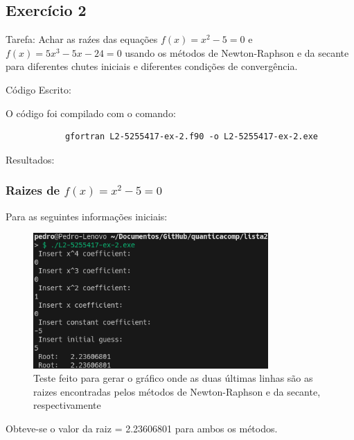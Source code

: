 \documentclass[12pt, a4paper]{article} %
\begin{document}
    \subsection{Exerc\'icio 2}

        Tarefa: Achar as ra\'zes das equa\c{c}\~oes $f(x) = x^2 - 5 = 0$ e $f(x) = 5x^3 - 5x - 24 = 0$ usando os m\'etodos de Newton-Raphson e da secante para diferentes chutes iniciais e diferentes condi\c{c}\~oes de converg\^encia.

        C\'odigo Escrito:
        

        O c\'odigo foi compilado com o comando:
        \begin{verbatim}
            gfortran L2-5255417-ex-2.f90 -o L2-5255417-ex-2.exe
        \end{verbatim}

        Resultados:

        \subsubsection{Raizes de $f(x) = x^2 - 5 = 0$}

            Para as seguintes informa\c{c}\~oes iniciais:
            \begin{figure}[H]
                \centering
                \includegraphics[width=0.8\textwidth]{../images/results-ex-2-5.png}
                \caption{Teste feito para gerar o gr\'afico onde as duas \'ultimas linhas s\~ao as raizes encontradas pelos m\'etodos de Newton-Raphson e da secante, respectivamente}
            \end{figure}
            Obteve-se o valor da raiz = 2.23606801 para ambos os m\'etodos.
\end{document}
